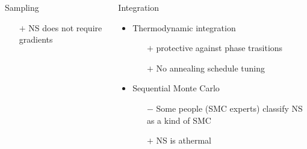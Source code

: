 \documentclass[aspectratio=169]{beamer}
\begin{document}
\begin{frame}
\begin{columns}[t]
\begin{block}{Sampling}
\begin{itemize}
\begin{itemize}
            \item[$+$] NS does not require gradients
        \end{itemize}
        \end{itemize}
            \end{block}
        \begin{block}{Integration}
            \begin{itemize}
                \item Thermodynamic integration
                    \begin{itemize}
                        \item[$+$] protective against phase trasitions
                        \item[$+$] No annealing schedule tuning 
                    \end{itemize}
                \item Sequential Monte Carlo
                    \begin{itemize}
                        \item[$-$] Some people (SMC experts) classify NS as a kind of SMC
                        \item[$+$] NS is athermal
                    \end{itemize}
            \end{itemize}
    \end{block}
    \end{columns}
\end{frame}
\end{document}
